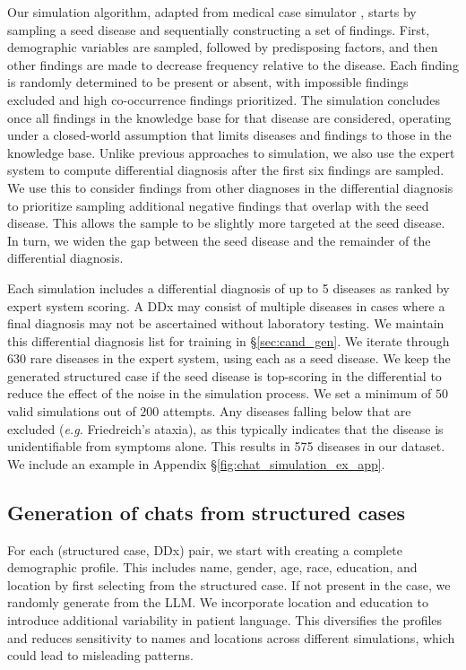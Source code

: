 Our simulation algorithm, adapted from medical case simulator \citet{qmr-simulated-cases, pmlr-v85-ravuri18a}, starts by sampling a seed disease and sequentially constructing a set of findings. First, demographic variables are sampled, followed by predisposing factors, and then other findings are made to decrease frequency relative to the disease. Each finding is randomly determined to be present or absent, with impossible findings excluded and high co-occurrence findings prioritized. The simulation concludes once all findings in the knowledge base for that disease are considered, operating under a closed-world assumption that limits diseases and findings to those in the knowledge base.  Unlike previous approaches to simulation, we also use the expert system to compute differential diagnosis after the first six findings are sampled.  We use this to consider findings from other diagnoses in the differential diagnosis to prioritize sampling additional negative findings that overlap with the seed disease. This allows the sample to be slightly more targeted at the seed disease. In turn, we widen the gap between the seed disease and the remainder of the differential diagnosis.

Each simulation includes a differential diagnosis of up to 5 diseases as ranked by expert system scoring. A DDx may consist of multiple diseases in cases where a final diagnosis may not be ascertained without laboratory testing. We maintain this differential diagnosis list for training in \S \ref{sec:cand_gen}. We iterate through 630 rare diseases in the expert system, using each as a seed disease. We keep the generated structured case if the seed disease is top-scoring in the differential to reduce the effect of the noise in the simulation process. We set a minimum of $50$ valid simulations out of $200$ attempts. Any diseases falling below that are excluded (\textit{e.g.} Friedreich's ataxia), as this typically indicates that the disease is unidentifiable from symptoms alone. This results in 575 diseases in our dataset. We include an example in Appendix \S \ref{fig:chat_simulation_ex_app}.

\subsection{Generation of chats from structured cases}
\label{sec:chat_generation}
For each (structured case, DDx) pair, we start with creating a complete demographic profile.  This includes name, gender, age, race, education, and location by first selecting from the structured case.  If not present in the case, we randomly generate from the LLM. We incorporate location and education to introduce additional variability in patient language. This diversifies the profiles and reduces sensitivity to names and locations across different simulations, which could lead to misleading patterns.

